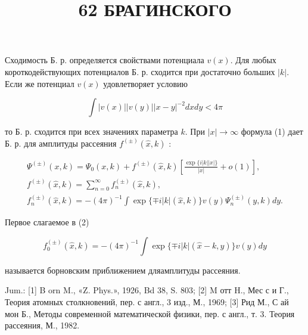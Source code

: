 \documentclass[10pt]{article}
\title{62 БРАГИНСКОГО }
\author{}
\date{}
\begin{document}
\maketitle

Сходимость Б. р. определяется свойствами потенциала $v(x)$. Для любых короткодействующих потенциалов Б. р. сходится при достаточно больших $|k|$. Если же потенциал $v(x)$ удовлетворяет условию



\[

\int|v(x)||v(y)||x-y|^{-2} d x d y<4 \pi

\]



то Б. р. сходится при всех значениях параметра $k$. При $|x| \rightarrow \infty$ формула (1) дает Б. р. для амплитуды рассеяния $f^{( \pm)}(\hat{x}, k)$ :



\[

\begin{gathered}

\Psi^{( \pm)}(x, k)=\Psi_{0}(x, k)+f^{( \pm)}(\hat{x}, k)\left[\frac{\exp \{i|k||x|\}}{|x|}+o(1)\right], \\

f^{( \pm)}(\hat{x}, k)=\sum_{n=0}^{\infty} f_{n}^{( \pm)}(\hat{x}, k), \\

f_{n}^{( \pm)}(\hat{x}, k)=-(4 \pi)^{-1} \int \exp \{\mp i|k|(\hat{x}, k)\} v(y) \Psi_{n}^{( \pm)}(y, k) d y .

\end{gathered}

\]



Первое слагаемое в (2)



\[

f_{0}^{( \pm)}(\hat{x}, k)=-(4 \pi)^{-1} \int \exp \{\mp i|k|(\hat{x}-k, y)\} v(y) d y

\]



называется борновским приближением дляамплитуды рассеяния.



Jum.: [1] B orn M., «Z. Phys.», 1926, Bd 38, S. 803; [2] M отт H., Мес с и Г., Теория атомных столкновений, пер. с англ., 3 изд., М., 1969; [3] Рид М., С ай мон Б., Методы современной математической физики, пер. с англ., т. 3. Теория рассеяния, М., 1982.
\end{document}
